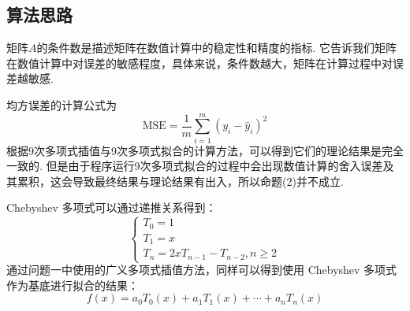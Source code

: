 \documentclass[UTF8,ctexart,a4paper,11pt,openany]{article}
\theoremstyle{definition}
\begin{document}
    \subsection{算法思路}
    矩阵$A$的条件数是描述矩阵在数值计算中的稳定性和精度的指标. 它告诉我们矩阵在数值计算中对误差的敏感程度，具体来说，条件数越大，矩阵在计算过程中对误差越敏感. \par 均方误差的计算公式为$$\text{MSE}=\frac{1}{m}\sum_{i=1}^m(y_i-\hat{y}_i)^2$$\indent 根据9次多项式插值与9次多项式拟合的计算方法，可以得到它们的理论结果是完全一致的. 但是由于程序运行9次多项式拟合的过程中会出现数值计算的舍入误差及其累积，这会导致最终结果与理论结果有出入，所以命题(2)并不成立.\par Chebyshev 多项式可以通过递推关系得到：$$\left\{\begin{array}{l}
        T_0=1 \\
        T_1=x \\
        T_n=2xT_{n-1}-T_{n-2}, n\geqslant 2
        \end{array}\right.$$
    通过问题一中使用的广义多项式插值方法，同样可以得到使用 Chebyshev 多项式作为基底进行拟合的结果：$$f(x)=a_0T_0(x)+a_1T_1(x)+\cdots+a_nT_n(x)$$
\end{document}
